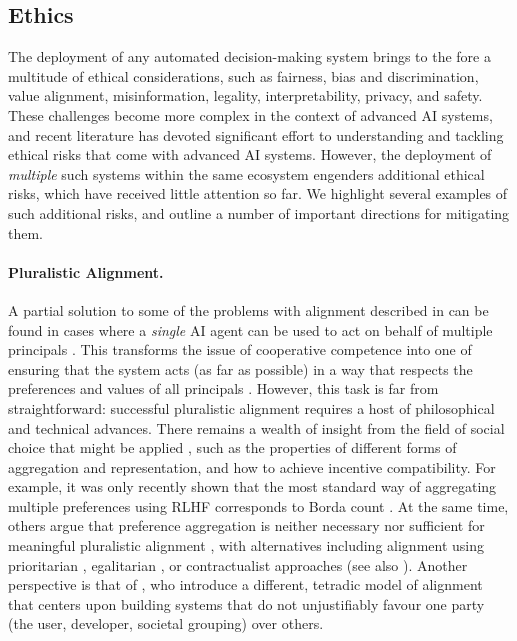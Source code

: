 \subsection{Ethics}
\label{sec:ethics}




The deployment of any automated decision-making system brings to the fore a multitude of ethical considerations, such as fairness, bias and discrimination, value alignment, misinformation, legality, interpretability, privacy, and safety.
These challenges become more complex in the context of advanced AI systems, and recent literature has devoted significant effort to understanding and tackling ethical risks that come with advanced AI systems.
However, the deployment of \textit{multiple} such systems within the same ecosystem engenders additional ethical risks, which have received little attention so far.
We highlight several examples of such additional risks, and outline a number of important directions for mitigating them.


\paragraph{Pluralistic Alignment.}
A partial solution to some of the problems with alignment described in  can be found in cases where a \textit{single} AI agent can be used to act on behalf of multiple principals \citep{fickinger2020multi}.
This transforms the issue of cooperative competence into one of ensuring that the system acts (as far as possible) in a way that respects the preferences and values of all principals \citep{Sorensen2024,Kasirzadeh2024a,Desai2018-mt}.
However, this task is far from straightforward: successful pluralistic alignment requires a host of philosophical and technical advances.
There remains a wealth of insight from the field of social choice that might be applied \citep{Prasad2018,Conitzer2024}, such as the properties of different forms of aggregation and representation, and how to achieve incentive compatibility.
For example, it was only recently shown that the most standard way of aggregating multiple preferences using RLHF corresponds to Borda count \citep{Siththaranjan2024}.
At the same time, others argue that preference aggregation is neither necessary nor sufficient for meaningful pluralistic alignment \citep{ZhiXuan2024}, with alternatives including 
alignment using prioritarian \citep{Gordon2022}, egalitarian \citep{Weidinger2023}, or contractualist \citep{ZhiXuan2022} approaches (see also ).
Another perspective is that of \citet{Gabriel2024}, who introduce a different, tetradic model of alignment that centers upon building systems that do not unjustifiably favour one party (the user, developer, societal grouping) over others.











